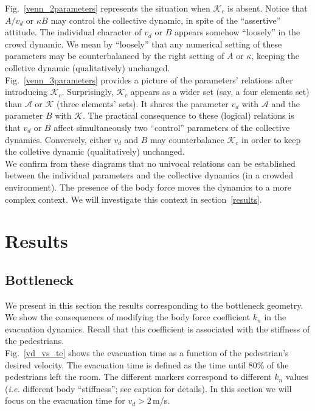 \documentclass[preprint,12pt]{elsarticle}
\begin{document}
Fig.~\ref{venn_2parameters} represents the situation when $\mathcal{K}_c$ is 
absent. Notice that $A/v_d$ or $\kappa B$ may control the collective 
dynamic, in spite of the ``assertive'' attitude. The individual character of 
$v_d$ or $B$ appears somehow ``loosely'' in the crowd dynamic. We mean by 
``loosely'' that any numerical setting of these parameters may be 
counterbalanced by the right setting of $A$ or $\kappa$, keeping the 
colletive dynamic (qualitatively) unchanged.  \\

Fig.~\ref{venn_3parameters} provides a picture of the parameters' relations 
after introducing $\mathcal{K}_c$. Surprisingly, $\mathcal{K}_c$ appears as a
wider set (say, a four elements set) than $\mathcal{A}$ or $\mathcal{K}$ (three 
elements' sets). It shares the parameter $v_d$ with $\mathcal{A}$ and the 
parameter $B$ with $\mathcal{K}$. The practical consequence to these (logical)
relations is that $v_d$ or $B$ affect simultaneously two ``control'' parameters 
of the collective dynamics. Conversely, either $v_d$ and $B$ may counterbalance 
$\mathcal{K}_c$ in order to keep the colletive dynamic (qualitatively) 
unchanged.  \\

We confirm from these diagrams that no univocal relations can be established 
between the individual parameters and the collective dynamics (in a crowded 
environment). The presence of the body force moves the dynamics to a more 
complex context. We will investigate this context in section~\ref{results}. \\


\section{\label{results}Results}


\subsection{\label{bottleneck} Bottleneck}


We present in this section the results corresponding to the bottleneck geometry. We show the consequences of modifying the body force coefficient $k_n$ in the evacuation dynamics. Recall that this coefficient is associated with the stiffness of the pedestrians. \\

Fig.~\ref{vd_vs_te} shows the evacuation time as a function of the pedestrian's desired velocity. The evacuation time is defined as the time until 80\% of the pedestrians left the room. The different markers correspond to different $k_n$ values (\textit{i.e.} different body ``stiffness''; see caption for details). In this section we will focus on the evacuation time for $v_d>2\,$m/s.\\
\end{document}
